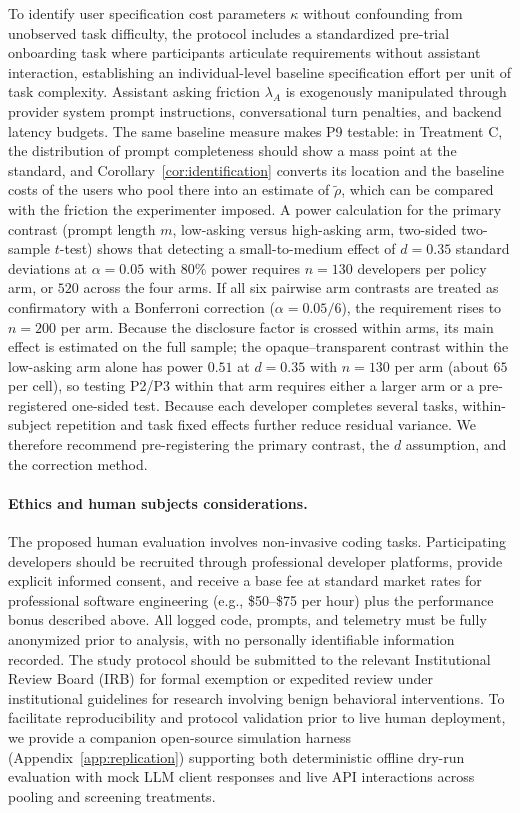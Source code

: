 \documentclass[11pt]{article}
\begin{document}
To identify user specification cost parameters $\kappa$ without confounding from unobserved task difficulty, the protocol includes a standardized pre-trial onboarding task where participants articulate requirements without assistant interaction, establishing an individual-level baseline specification effort per unit of task complexity. Assistant asking friction $\lambda_A$ is exogenously manipulated through provider system prompt instructions, conversational turn penalties, and backend latency budgets. The same baseline measure makes P9 testable: in Treatment C, the distribution of prompt completeness should show a mass point at the standard, and Corollary~\ref{cor:identification} converts its location and the baseline costs of the users who pool there into an estimate of $\tilde\rho$, which can be compared with the friction the experimenter imposed.
A power calculation for the primary contrast (prompt length $m$, low-asking versus high-asking arm, two-sided two-sample $t$-test) shows that detecting a small-to-medium effect of $d = 0.35$ standard deviations at $\alpha = 0.05$ with $80\%$ power requires $n = 130$ developers per policy arm, or $520$ across the four arms. If all six pairwise arm contrasts are treated as confirmatory with a Bonferroni correction ($\alpha = 0.05/6$), the requirement rises to $n = 200$ per arm. Because the disclosure factor is crossed within arms, its main effect is estimated on the full sample; the opaque--transparent contrast within the low-asking arm alone has power $0.51$ at $d = 0.35$ with $n = 130$ per arm (about $65$ per cell), so testing P2/P3 within that arm requires either a larger arm or a pre-registered one-sided test. Because each developer completes several tasks, within-subject repetition and task fixed effects further reduce residual variance. We therefore recommend pre-registering the primary contrast, the $d$ assumption, and the correction method.

\paragraph{Ethics and human subjects considerations.}
The proposed human evaluation involves non-invasive coding tasks. Participating developers should be recruited through professional developer platforms, provide explicit informed consent, and receive a base fee at standard market rates for professional software engineering (e.g., \$50--\$75 per hour) plus the performance bonus described above. All logged code, prompts, and telemetry must be fully anonymized prior to analysis, with no personally identifiable information recorded. The study protocol should be submitted to the relevant Institutional Review Board (IRB) for formal exemption or expedited review under institutional guidelines for research involving benign behavioral interventions.
To facilitate reproducibility and protocol validation prior to live human deployment, we provide a companion open-source simulation harness (Appendix~\ref{app:replication}) supporting both deterministic offline dry-run evaluation with mock LLM client responses and live API interactions across pooling and screening treatments.
\end{document}
